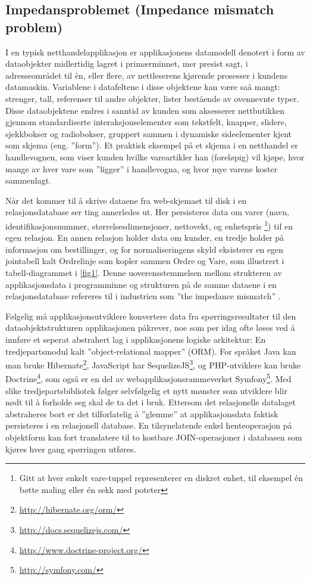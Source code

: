 \subsection{Impedansproblemet (Impedance mismatch problem)}

I en typisk netthandelapplikasjon er applikasjonens datamodell denotert i form av dataobjekter midlertidig lagret i primærminnet, mer presist sagt, i adresseområdet til èn, eller flere, av nettleserens kjørende prosesser i kundens datamaskin. Variablene i datafeltene i disse objektene kan være saå mangt: strenger, tall, referenser til andre objekter, lister bestående av ovennevnte typer. Disse dataobjektene endres i sanntid av kunden som aksesserer nettbutikken gjennom standardiserte interaksjonselementer som tekstfelt, knapper, slidere, sjekkbokser og radiobokser, gruppert sammen i dynamiske sideelementer kjent som skjema (eng. ''form''). Et praktisk eksempel på et skjema i en netthandel er handlevognen, som viser kunden hvilke vareartikler han (foreløpig) vil kjøpe, hvor mange av hver vare som ''ligger'' i handlevogna, og hvor mye varene koster sammenlagt.

Når det kommer til å skrive dataene fra web-skjemaet til disk i en relasjonsdatabase ser ting annerledes ut. Her persisteres data om varer (navn, identifikasjonsnummer, størrelsesdimensjoner, nettovekt, og enhetspris \footnote{Gitt at hver enkelt vare-tuppel representerer en diskret enhet, til eksempel én bøtte maling eller én sekk med poteter}) til en egen relasjon. En annen relasjon holder data om kunder, en tredje holder på informasjon om bestillinger, og for normaliseringens skyld eksisterer en egen jointabell kalt Ordrelinje som kopler sammen Ordre og Vare, som illustrert i tabell-diagrammet i \ref{fig1}. Denne uoverensstemmelsen mellom strukteren av applikasjonsdata i programminne og strukturen på de samme dataene i en relasjonsdatabase refereres til i industrien som ''the impedance mismatch'' \citep{sadalage2013}.

Følgelig må applikasjonsutviklere konvertere data fra spørringsresultater til den dataobjektstrukturen applikasjonen påkrever, noe som per idag ofte løses ved å innføre et seperat abstrahert lag i applikasjonens logiske arkitektur: En tredjepartsmodul kalt ''object-relational mapper'' (ORM). For språket Java kan man bruke Hibernate\footnote{\url{http://hibernate.org/orm/}}, JavaScript har SequelizeJS\footnote{\url{http://docs.sequelizejs.com/}}, og PHP-utviklere kan bruke Doctrine\footnote{\url{http://www.doctrine-project.org/}}, som også er en del av webapplikasjonsrammeverket Symfony\footnote{\url{http://symfony.com/}}. Med slike tredjepartsbibliotek følger selvfølgelig et nytt mønster som utviklere blir nødt til å forholde seg skal de ta det i bruk. Ettersom det relasjonelle datalaget abstraheres bort er det tilforlatelig å ''glemme'' at applikasjonsdata faktisk persisteres i en relasjonell database. En tilsynelatende enkel henteoperasjon på objektform kan fort translatere til to kostbare JOIN-operasjoner i databasen som kjøres hver gang spørringen utføres.

